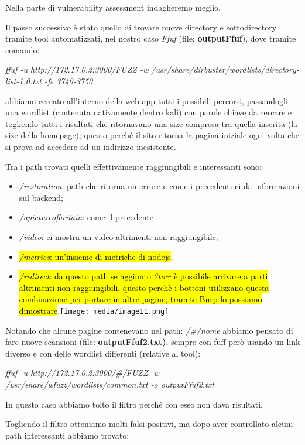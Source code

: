 Nella parte di vulnerability assessment indagheremo meglio.

Il passo successivo è stato quello di trovare nuove directory e
sottodirectory tramite tool automatizzati, nel nostro caso \emph{Ffuf}
(file: \textbf{outputFfuf}), dove tramite comando:

\emph{ffuf -u http://172.17.0.2:3000/FUZZ -w
/usr/share/dirbuster/wordlists/directory-list-1.0.txt -fs 3740-3750}

abbiamo cercato all'interno della web app tutti i possibili percorsi,
passandogli una wordlist (contenuta nativamente dentro kali) con parole
chiave da cercare e togliendo tutti i risultati che ritornavano una size
compresa tra quella inserita (la size della homepage); questo perché il
sito ritorna la pagina iniziale ogni volta che si prova ad accedere ad
un indirizzo inesistente.

Tra i path trovati quelli effettivamente raggiungibili e interessanti
sono:

\begin{itemize}
\item
  \emph{/restoration}: path che ritorna un errore e come i precedenti ci
  da informazioni sul backend;
\item
  \emph{/apictureofbritain}: come il precedente
\item
  \emph{/video}: ci mostra un video altrimenti non raggiungibile;
\item
  \hl{\emph{/metrics}: un'insieme di metriche di nodejs};
\item
  \hl{\emph{/redirect}: da questo path se aggiunto \emph{?to=} è
  possibile arrivare a parti altrimenti non raggiungibili, questo perchè
  i bottoni utilizzano questa combinazione per portare in altre pagine,
  tramite Burp lo possiamo
  dimostrare}.\texttt{[image: media/image11.png]}
\end{itemize}

Notando che alcune pagine contenevano nel path: \emph{/\#/nome} abbiamo
pensato di fare nuove scansioni (file: \textbf{outputFfuf2.txt)}, sempre
con fuff però usando un link diverso e con delle wordlist differenti
(relative al tool):

\emph{ffuf -u http://172.17.0.2:3000/\#/FUZZ -w
/usr/share/wfuzz/wordlists/common.txt -o outputFfuf2.txt}

In questo caso abbiamo tolto il filtro perché con esso non dava
risultati.

Togliendo il filtro otteniamo molti falsi positivi, ma dopo aver
controllato alcuni path interessanti abbiamo trovato:

